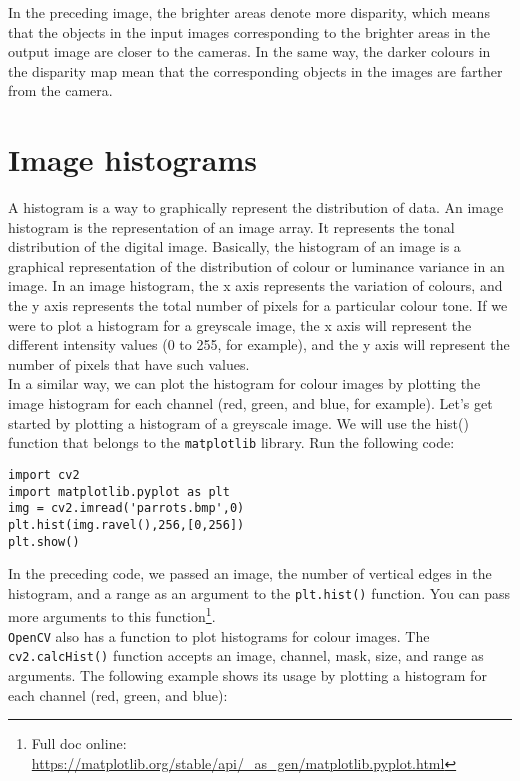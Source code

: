 \documentclass{labo}
\newcommand{\opencv}{\texttt{OpenCV} }
\begin{document}
In the preceding image, the brighter areas denote more disparity, which means that the objects in the input images corresponding to the brighter areas in the output image are closer to the cameras. In the same way, the darker colours in the disparity map mean that the corresponding objects in the images are farther from the camera.




\section*{Image histograms}
A histogram is a way to graphically represent the distribution of data. An image histogram is the representation of an image array. It represents the tonal distribution of the digital image. Basically, the histogram of an image is a graphical representation of the distribution of colour or luminance variance in an image. In an image histogram, the x axis represents the variation of colours, and the y axis represents the total number of pixels for a particular colour tone. If we were to plot a histogram for a greyscale image, the x axis will represent the different intensity values (0 to 255, for example), and the y axis will represent the number of pixels that have such values.\\

In a similar way, we can plot the histogram for colour images by plotting the image histogram for each channel (red, green, and blue, for example). Let's get started by plotting a histogram of a greyscale image. We will use the hist() function that belongs to the \texttt{matplotlib} library. Run the following code:

\begin{verbatim}
import cv2 
import matplotlib.pyplot as plt 
img = cv2.imread('parrots.bmp',0) 
plt.hist(img.ravel(),256,[0,256]) 
plt.show()
\end{verbatim}

In the preceding code, we passed an image, the number of vertical edges in the histogram, and a range as an argument to the \texttt{plt.hist()} function. You can pass more arguments to this function\footnote{Full doc online: \url{https://matplotlib.org/stable/api/_as_gen/matplotlib.pyplot.html}}.\\

\opencv also has a function to plot histograms for colour images. The \texttt{cv2.calcHist()} function accepts an image, channel, mask, size, and range as arguments. The following example shows its usage by plotting a histogram for each channel (red, green, and blue):
\end{document}
